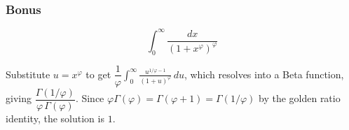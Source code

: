 \subsubsection*{Bonus}
\begin{questions}

\question \[ \int_0^\infty \frac{dx}{\left(1+x^{\varphi}\right)^{\varphi}} \]
\begin{solution}
Substitute $u=x^\varphi$ to get $\dfrac{1}{\varphi}\displaystyle\int_0^\infty \frac{u^{1/\varphi - 1}}{(1+u)^\varphi}\, du$, which resolves into a Beta function, giving $\dfrac{\Gamma(1/\varphi)}{\varphi\,\Gamma(\varphi)}$. Since $\varphi\Gamma(\varphi)=\Gamma(\varphi+1)=\Gamma(1/\varphi)$ by the golden ratio identity, the solution is $1$.
\end{solution}

\end{questions}
